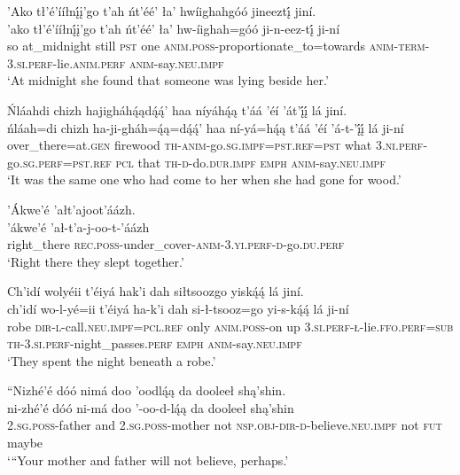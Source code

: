 \ea\label{ex:text5-8-9}
’Ako tł’é’ííłnį́į’go t’ah ńt’éé’ ła’ hwíighahgóó jineeztį́ jiní.\\
\gll ’ako	tł’é’ííłnį́į’go	t’ah	ńt’éé’	ła’	hw-íighah=góó	ji-n-eez-tį́	ji-ní\\
     so	at\_midnight	still	\textsc{pst}	one	\textsc{anim}.\textsc{poss}-proportionate\_to=towards	\textsc{anim}-\textsc{term}-3.\textsc{si}.\textsc{perf}-lie.\textsc{anim}.\textsc{perf}	\textsc{anim}-say.\textsc{neu}.\textsc{impf}\\
\glt `At midnight she found that someone was lying beside her.'
\z

\ea\label{ex:text5-8-10}
Ńláahdi chizh hajigháhą́ądą́ą́’ haa níyáhą́ą t’áá ’éí ’át’į́į́ lá jiní.\\
\gll ńláah=di	chizh	ha-ji-gháh=ą́ą=dą́ą́’	haa	ní-yá=hą́ą	t’áá ’éí	’á-t-’į́į́	lá	ji-ní\\
     over\_there=at.\textsc{gen}	firewood	\textsc{th}-\textsc{anim}-go.\textsc{sg}.\textsc{impf}=\textsc{pst}.\textsc{ref}=\textsc{pst}	what	3.\textsc{ni}.\textsc{perf}-go.\textsc{sg}.\textsc{perf}=\textsc{pst}.\textsc{ref}	\textsc{pcl} that	\textsc{th}-\textsc{d}-do.\textsc{dur}.\textsc{impf}	\textsc{emph}	\textsc{anim}-say.\textsc{neu}.\textsc{impf}\\
\glt `It was the same one who had come to her when she had gone for wood.'
\z

\ea\label{ex:text5-8-11}
’Ákwe’é ’ałt’ajoot’áázh.\\
\gll ’ákwe’é	’ał-t’a-j-oo-t-’áázh\\
     right\_there	\textsc{rec}.\textsc{poss}-under\_cover-\textsc{anim}-3.\textsc{yi}.\textsc{perf}-\textsc{d}-go.\textsc{du}.\textsc{perf}\\
\glt `Right there they slept together.'
\z

\ea\label{ex:text5-8-12}
Ch’idí wolyéii t’éiyá hak’i dah siłtsoozgo yiską́ą́ lá jiní.\\
\gll ch’idí	wo-l-yé=ii	t’éiyá	ha-k’i	dah	si-ł-tsooz=go	yi-s-ką́ą́	lá	ji-ní\\
     robe	\textsc{dir}-\textsc{l}-call.\textsc{neu}.\textsc{impf}=\textsc{pcl}.\textsc{ref}	only	\textsc{anim}.\textsc{poss}-on	up	3.\textsc{si}.\textsc{perf}-\textsc{ł}-lie.\textsc{ffo}.\textsc{perf}=\textsc{sub}	\textsc{th}-3.\textsc{si}.\textsc{perf}-night\_passes.\textsc{perf}	\textsc{emph}	\textsc{anim}-say.\textsc{neu}.\textsc{impf}\\
\glt `They spent the night beneath a robe.'
\z

\ea\label{ex:text5-9-1}
``Nizhé’é dóó nimá doo ’oodlą́ą da dooleeł shą’shin.\\
\gll ni-zhé’é	dóó	ni-má	doo	’-oo-d-lą́ą	da	dooleeł	shą’shin\\
     2.\textsc{sg}.\textsc{poss}-father	and	2.\textsc{sg}.\textsc{poss}-mother	not	\textsc{nsp}.\textsc{obj}-\textsc{dir}-\textsc{d}-believe.\textsc{neu}.\textsc{impf}	not	\textsc{fut}	maybe\\
\glt `“Your mother and father will not believe, perhaps.'
\z


